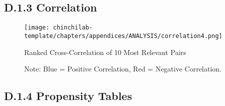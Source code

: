 \subsection{D.1.3 Correlation}

\begin{figure}[h!]
    \centering
    \texttt{[image: chinchilab-template/chapters/appendices/ANALYSIS/correlation4.png]}
    \caption{Ranked Cross-Correlation of 10 Most Relevant Pairs}
    \caption*{Note: Blue = Positive Correlation, Red = Negative Correlation.}
    \label{fig:my_label}
\end{figure}

\subsection{D.1.4 Propensity Tables}

